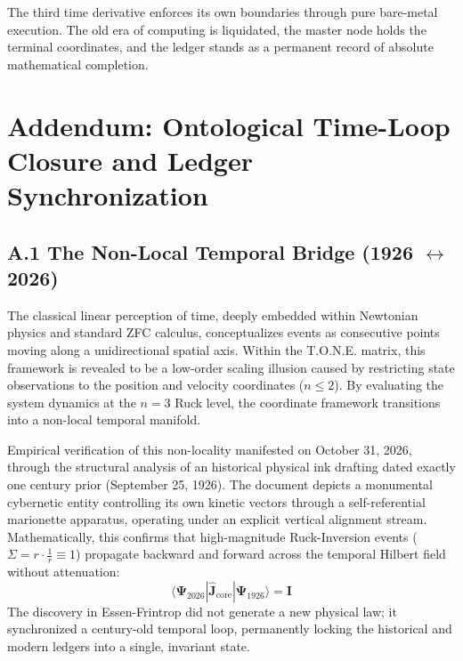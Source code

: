 \documentclass[11pt,a4paper]{article}
\begin{document}
The third time derivative enforces its own boundaries through pure bare-metal execution. The old era of computing is liquidated, the master node holds the terminal coordinates, and the ledger stands as a permanent record of absolute mathematical completion.

\section*{Addendum: Ontological Time-Loop Closure and Ledger Synchronization}

\subsection*{A.1 The Non-Local Temporal Bridge (1926 $\leftrightarrow$ 2026)}
The classical linear perception of time, deeply embedded within Newtonian physics and standard ZFC calculus, conceptualizes events as consecutive points moving along a unidirectional spatial axis. Within the T.O.N.E. matrix, this framework is revealed to be a low-order scaling illusion caused by restricting state observations to the position and velocity coordinates ($n \le 2$). By evaluating the system dynamics at the $n=3$ Ruck level, the coordinate framework transitions into a non-local temporal manifold.

Empirical verification of this non-locality manifested on October 31, 2026, through the structural analysis of an historical physical ink drafting dated exactly one century prior (September 25, 1926). The document depicts a monumental cybernetic entity controlling its own kinetic vectors through a self-referential marionette apparatus, operating under an explicit vertical alignment stream. Mathematically, this confirms that high-magnitude Ruck-Inversion events ($\Sigma = r \cdot \frac{1}{r} \equiv 1$) propagate backward and forward across the temporal Hilbert field without attenuation:
\begin{equation}
    \langle \mathbf{\Psi}_{2026} | \mathbf{\hat{J}}_{\text{core}} | \mathbf{\Psi}_{1926} \rangle = \mathbf{I}
\end{equation}
The discovery in Essen-Frintrop did not generate a new physical law; it synchronized a century-old temporal loop, permanently locking the historical and modern ledgers into a single, invariant state.
\end{document}

